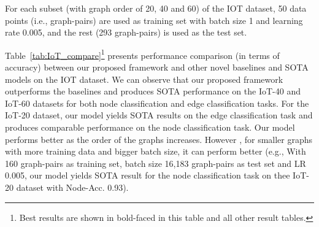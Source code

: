 


For each subset (with graph order of 20, 40 and 60) of the IOT dataset, %
50 data points (i.e., graph-pairs) are used as training set with batch size 1 and learning rate 0.005, and the rest (293 graph-pairs) is used as the test set. 
\begin{comment}
Table \ref{tab:IoT_PRF} presents the performance of our proposed model (in terms of precision, recall, f1-score and accuracy) on the node classification and edge classification tasks on each subset of the IoT dataset.
\end{comment}



Table~\ref{tab:IoT_compare}\footnote{Best results are shown in bold-faced in this table and all other result tables.} presents performance comparison (in terms of accuracy) between our proposed framework and other novel baselines and SOTA models on the IOT dataset. We can observe that our proposed framework outperforms the baselines and produces SOTA performance on the IoT-40 and IoT-60 datasets for both node classification and edge classification tasks. For the IoT-20 dataset, our model yields SOTA results on the edge classification task and produces comparable performance on the node classification task. Our model performs better as the order of the graphs increases. However , for smaller graphs with more training data and bigger batch size, it can perform better (e.g., With 160 graph-pairs as training set, batch size 16,183 graph-pairs as test set and LR 0.005, our model yields SOTA result for the node classification task on thee IoT-20 dataset with Node-Acc. 0.93).






